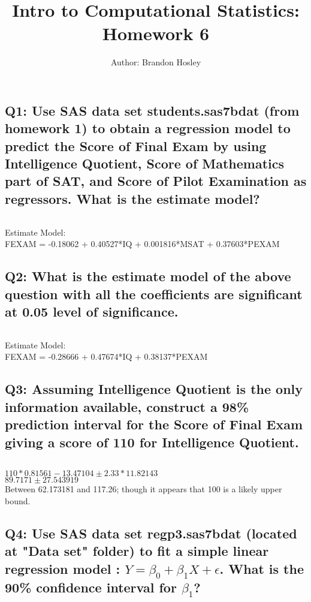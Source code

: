 \documentclass[a4paper,man,natbib]{apa6}
\title{Intro to Computational Statistics: Homework 6}
\author{Author: Brandon Hosley}
\affiliation{Instructor: Liang Kong, Ph.D}
\begin{document}
\maketitle
\singlespacing
	
\subsection*{Q1: Use SAS data set students.sas7bdat (from homework 1) to obtain a regression model to predict the Score of Final Exam by using Intelligence Quotient, Score of Mathematics part of SAT, and Score of Pilot Examination as regressors. What is the estimate model? }
\inputminted[breaklines,bgcolor=light-gray]{sas}{./Snippets/DAT502-HW6-1.sas}
Estimate Model: \\
FEXAM = -0.18062 + 0.40527*IQ + 0.001816*MSAT + 0.37603*PEXAM



\subsection*{Q2: What is the estimate model of the above question with all the coefficients are significant at 0.05 level of significance. }
\inputminted[breaklines,bgcolor=light-gray]{sas}{./Snippets/DAT502-HW6-2.sas}
Estimate Model: \\
FEXAM = -0.28666 + 0.47674*IQ + 0.38137*PEXAM



\subsection*{Q3: Assuming Intelligence Quotient is the only information available, construct a 98\% prediction interval for the Score of Final Exam giving a score of 110 for Intelligence Quotient. }
\inputminted[breaklines,bgcolor=light-gray]{sas}{./Snippets/DAT502-HW6-3.sas}

$ 110 * 0.81561 - 13.47104 \pm 2.33 * 11.82143 $ \\
$ 89.7171 \pm 27.543919 $ \\
Between 62.173181 and 117.26; though it appears that 100 is a likely upper bound.



\subsection*{Q4: Use SAS data set regp3.sas7bdat (located at "Data set" folder) to fit a simple linear regression model : $Y = \beta_0 + \beta_1X + \epsilon$. What is the 90\% confidence interval for $\beta_1$?
 }
% 
\end{document}
